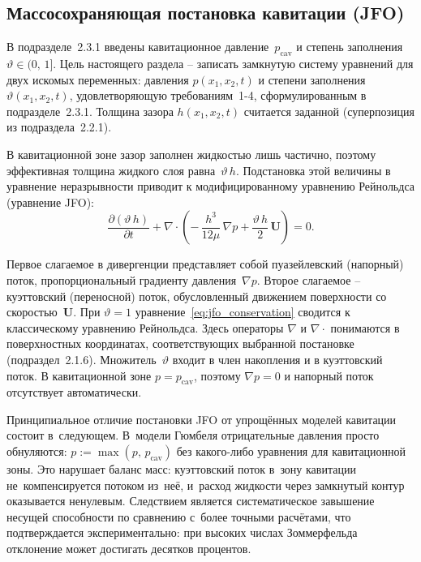 \subsection{Массосохраняющая постановка кавитации (JFO)}

В подразделе~2.3.1 введены кавитационное давление~$p_{\mathrm{cav}}$
и степень заполнения~$\vartheta \in (0,\,1]$.  Цель настоящего раздела --
записать замкнутую систему уравнений для двух искомых переменных:
давления $p(x_1, x_2, t)$ и степени заполнения
$\vartheta(x_1, x_2, t)$, удовлетворяющую требованиям~1-4,
сформулированным в подразделе~2.3.1.  Толщина зазора
$h(x_1, x_2, t)$ считается заданной (суперпозиция из
подраздела~2.2.1).

В кавитационной зоне зазор заполнен жидкостью лишь частично,
поэтому эффективная толщина жидкого слоя равна~$\vartheta\,h$.
Подстановка этой величины в уравнение неразрывности приводит
к модифицированному уравнению Рейнольдса (уравнение JFO):
\begin{equation}\label{eq:jfo_conservation}
  \frac{\partial (\vartheta\,h)}{\partial t}
  + \nabla \cdot \!\left(
    -\,\frac{h^3}{12\mu}\,\nabla p
    + \frac{\vartheta\,h}{2}\,\mathbf{U}
  \right) = 0.
\end{equation}

Первое слагаемое в дивергенции представляет собой пуазейлевский
(напорный) поток, пропорциональный градиенту давления~$\nabla p$.
Второе слагаемое -- куэттовский (переносной) поток, обусловленный
движением поверхности со скоростью~$\mathbf{U}$.  При $\vartheta = 1$
уравнение~\eqref{eq:jfo_conservation} сводится к классическому
уравнению Рейнольдса.  Здесь операторы $\nabla$ и $\nabla\!\cdot$
понимаются в поверхностных координатах, соответствующих выбранной
постановке (подраздел~2.1.6).  Множитель~$\vartheta$ входит в член
накопления и в куэттовский поток.  В кавитационной зоне
$p = p_{\mathrm{cav}}$, поэтому $\nabla p = 0$ и напорный поток
отсутствует автоматически.

Принципиальное отличие постановки JFO от упрощённых моделей кавитации состоит в~следующем. В~модели Гюмбеля отрицательные давления просто обнуляются: $p := \max(p,\, p_{\mathrm{cav}})$ без какого-либо уравнения для кавитационной зоны. Это нарушает баланс масс: куэттовский поток в~зону кавитации не~компенсируется потоком из~неё, и~расход жидкости через замкнутый контур оказывается ненулевым. Следствием является систематическое завышение несущей способности по сравнению с~более точными расчётами, что подтверждается экспериментально: при высоких числах Зоммерфельда отклонение может достигать десятков процентов.

